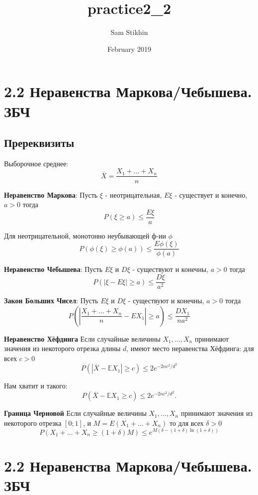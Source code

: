 \documentclass[a4paper, 14pt]{extarticle}
\title{practice2_2}
\author{Sam Stikhin}
\date{February 2019}
\begin{document}
\section*{2.2 Неравенства Маркова/Чебышева. ЗБЧ}
\subsection*{Пререквизиты}
Выборочное среднее:
$$\overline{X} = \frac{X_1 + \ldots + X_n}{n}$$

\textbf{Неравенство Маркова}: Пусть $\xi$ - неотрицательная, $E\xi$ - существует и конечно, $a>0$ тогда
$$P(\xi \geq a) \leq \frac{E\xi}{a}$$

Для неотрицательной, монотонно неубывающей ф-ии $\phi$
$$P(\phi(\xi) \geq \phi(a)) \leq \frac{E\phi(\xi)}{\phi(a)}$$

\textbf{Неравенство Чебышева}: Пусть $E\xi$ и $D\xi$ - существуют и конечны, $a>0$ тогда
$$P(|\xi - E\xi| \geq a) \leq \frac{D\xi}{a^2}$$

\textbf{Закон Больших Чисел}: Пусть $E\xi$ и $D\xi$ - существуют и конечны, $a>0$ тогда
$$P\left(\left|\frac{X_1 + \ldots + X_n}{n} - EX_1\right| \geq a\right) \leq \frac{DX_1}{na^2}$$

\textbf{Неравенство Хёфдинга} Если случайные величины $X_1,\dots,X_n$ принимают значения из некоторого отрезка длины $d$, имеют место неравенства Хёфдинга: для всех $c>0$
$$P({|\overline{X}-\mathbb{E}{X}_1|\geq c})\leq 2e^{-2nc^2/d^2}$$

Нам хватит и такого:
$$P({\overline{X}-\mathbb{E}{X}_1\geq c})\leq 2e^{-2nc^2/d^2}.$$

\textbf{Граница Черновой} Если случайные величины $X_1,\dots,X_n$ принимают значения из некоторого отрезка $[0;1]$, и $M = E(X_1 + \ldots + X_n)$ то для всех $\delta>0$
$$P(X_1 + \ldots + X_n \geq (1 + \delta)M)\leq e^{M(\delta - (1+\delta)\ln(1+\delta))}$$


\newpage
\section*{2.2 Неравенства Маркова/Чебышева. ЗБЧ}
\end{document}
